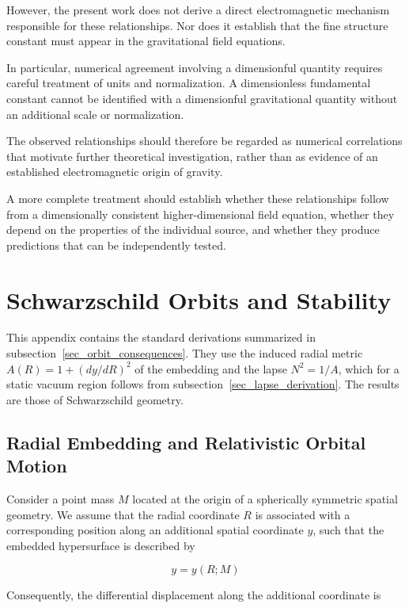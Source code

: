 \documentclass[pdflatex,sn-mathphys-num]{sn-jnl}%
\theoremstyle{thmstyleone}%
\theoremstyle{thmstyletwo}%
\theoremstyle{thmstylethree}%
\begin{document}
\begin{appendices}
However, the present work does not derive a direct electromagnetic mechanism responsible for these relationships. Nor does it establish that the fine structure constant must appear in the gravitational field equations.

In particular, numerical agreement involving a dimensionful quantity requires careful treatment of units and normalization. A dimensionless fundamental constant cannot be identified with a dimensionful gravitational quantity without an additional scale or normalization.

The observed relationships should therefore be regarded as numerical correlations that motivate further theoretical investigation, rather than as evidence of an established electromagnetic origin of gravity.

A more complete treatment should establish whether these relationships follow from a dimensionally consistent higher-dimensional field equation, whether they depend on the properties of the individual source, and whether they produce predictions that can be independently tested.



\section{Schwarzschild Orbits and Stability}\label{app_orbits}

This appendix contains the standard derivations summarized in subsection~\ref{sec_orbit_consequences}. They use the induced radial metric $A(R)=1+(dy/dR)^2$ of the embedding and the lapse $N^2=1/A$, which for a static vacuum region follows from subsection~\ref{sec_lapse_derivation}. The results are those of Schwarzschild geometry.

\subsection{Radial Embedding and Relativistic Orbital Motion}

Consider a point mass $M$ located at the origin of a spherically symmetric spatial geometry. We assume that the radial coordinate $R$ is associated with a corresponding position along an additional spatial coordinate $y$, such that the embedded hypersurface is described by

\begin{equation}
    y=y(R;M)
\end{equation}

Consequently, the differential displacement along the additional coordinate is


\end{appendices}
\end{document}
